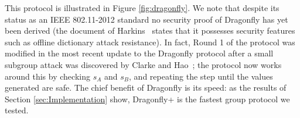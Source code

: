 This protocol is illustrated in Figure \ref{fig:dragonfly}.  We note that despite its status as an IEEE 802.11-2012 standard no security
proof of Dragonfly has yet been derived (the document of Harkins~\cite{Ha15} states that it possesses security features such as offline
dictionary attack resistance).  In fact, Round 1 of the protocol was modified in the most recent update      %
to the Dragonfly protocol after a small subgroup attack was discovered by Clarke and Hao~\cite{Ha2014}; the protocol now works around this
by checking $s_A$ and $s_B$, and repeating the step until the values generated are safe. The chief benefit of Dragonfly is its speed:
as the results of Section \ref{sec:Implementation} show, Dragonfly+ is the fastest group protocol we tested.

